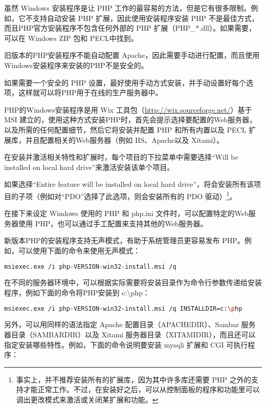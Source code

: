 虽然 Windows 安装程序是让 PHP 工作的最容易的方法，但是它有很多限制。例如，它不支持自动安装 PHP 扩展，因此使用安装程序安装 PHP 不是最佳方式，而且PHP官方安装程序不包含任何外部的 PHP 扩展（PHP\_*.dll）。如果需要，可以在 Windows ZIP 包和 PECL中找到。

旧版本的PHP安装程序不能自动配置 Apache，因此需要手动进行配置，而且使用Windows安装程序来安装的PHP不是安全的。

如果需要一个安全的 PHP 设置，最好使用手动方式安装，并手动设置好每个选项，这样就可以将PHP用于在线的生产服务器中。

PHP的Windows安装程序是用 Wix 工具包（\url{http://wix.sourceforge.net/}）基于 MSI 建立的，使用这种方式安装PHP时，首先会提示选择要配置的Web服务器，以及所需的任何配置细节，然后它将安装并配置 PHP 和所有内置以及 PECL 扩展库，并且配置相关的Web服务器（例如 IIS、Apache以及 Xitami）。

在安装并激活相关特性和扩展时，每个项目的下拉菜单中需要选择“Will be installed on local hard drive”来激活安装该单个项目。

如果选择“Entire feature will be installed on local hard drive”，将会安装所有该项目的子项（例如对“PDO”选择了此选项，则会安装所有的 PDO 驱动）\footnote{事实上，并不推荐安装所有的扩展库，因为其中许多库还需要 PHP 之外的支持才能正常工作。不过，在安装好之后，可以从控制面板的程序和功能里可以调出更改模式来激活或关闭某扩展和功能。}。

在接下来设定 Windows 使用的 PHP 和 php.ini 文件时，可以配置特定的Web服务器使用 PHP，也可以通过手工配置来支持其他的Web服务器。


新版本PHP的安装程序支持无声模式，有助于系统管理员更容易发布 PHP。例如，可以使用下面的命令来使用无声模式：

\begin{lstlisting}[language=bash]
msiexec.exe /i php-VERSION-win32-install.msi /q
\end{lstlisting}

在不同的服务器环境中，可以根据实际需要将安装目录作为命令行参数传递给安装程序，例如下面的命令将PHP安装到 c:{\textbackslash}php：

\begin{lstlisting}[language=bash]
msiexec.exe /i php-VERSION-win32-install.msi /q INSTALLDIR=c:\php
\end{lstlisting}

另外，可以用同样的语法指定 Apache 配置目录（APACHEDIR）、Sambar 服务器目录（SAMBARDIR）以及 Xitami 服务器目录（XITAMIDIR），而且还可以指定安装哪些特性。例如，下面的命令说明要安装 mysqli 扩展和 CGI 可执行程序：

